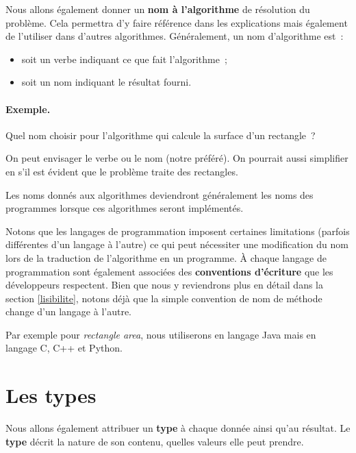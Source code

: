 		Nous allons également donner un \textbf{nom à l’algorithme}
		de résolution du problème.
		Cela permettra d’y faire référence dans les explications
		mais également de l’utiliser dans d’autres algorithmes.
		Généralement, un nom d’algorithme est~:
		\begin{itemize}
		\item soit un verbe indiquant ce que fait l’algorithme~;
		\item soit un nom indiquant le résultat fourni.	
		\end{itemize}
	
		\begin{Emphase}
			\paragraph{Exemple.}	
			Quel nom choisir pour l’algorithme 
			qui calcule la surface d’un rectangle~?
	
			On peut envisager 
			le verbe 
			ou le nom  (notre préféré).
			On pourrait aussi simplifier en 
			s’il est évident que le problème traite des rectangles.
		\end{Emphase}
	
		Les noms donnés aux algorithmes deviendront généralement les noms des
		programmes lorsque ces algorithmes seront implémentés. 

		Notons que les langages de programmation imposent certaines limitations
		(parfois différentes d’un langage à l’autre) ce qui peut nécessiter une
		modification du nom lors de la traduction de l’algorithme en un
		programme. À chaque langage de programmation sont également associées
		des \textbf{conventions d'écriture} que les développeurs respectent.
		Bien que nous y reviendrons plus en détail dans la section
		\ref{lisibilite}, notons déjà que la simple convention de nom de méthode
		change d'un langage à l'autre. 
		
		Par exemple pour \textit{rectangle area}, nous utiliserons
		 en langage Java mais  en langage
		C, C++ et Python. 

	\section{Les types}
		
		Nous allons également attribuer un \textbf{type} à chaque donnée ainsi
		qu’au résultat.  Le \textbf{type} décrit la nature de son contenu,
		quelles valeurs elle peut prendre.
		
